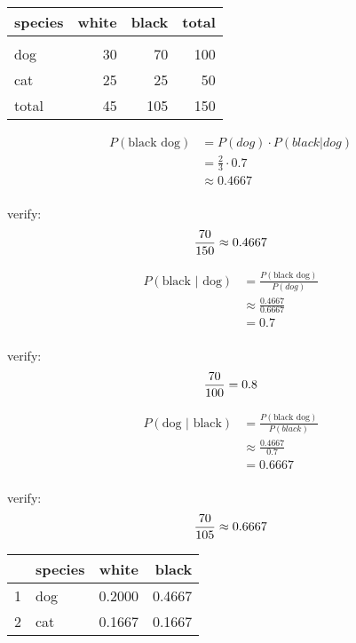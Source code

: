 \documentclass[landscape]{exam}
\begin{document}
  \begin{tabular}[H]{lrrr}
    \toprule
    species & white & black & total\\
    \midrule \\
    dog     & 30    & 70    & 100\\
    cat     & 25    & 25    & 50\\
    \midrule
    total   & 45    & 105   & 150\\
    \bottomrule
  \end{tabular}

  \begin{align*}
    P(\text{black dog}) & = P(dog) \cdot P(black | dog) \\
                        & = \frac{2}{3} \cdot 0.7 \\
                        & \approx 0.4667 \\
  \end{align*}
  
  verify:
  \[
    \frac{70}{150} \approx 0.4667 \\
  \]

  \begin{align*}
    P(\text{black | dog}) & = \frac{P(\text{black dog})}{P(dog)} \\
                          & \approx \frac{0.4667}{0.6667} \\
                          & = 0.7 \\
  \end{align*}

  verify:
  \[
    \frac{70}{100} = 0.8 \\
  \]

  \begin{align*}
    P(\text{dog | black}) & = \frac{P(\text{black dog})}{P(black)} \\
                          & \approx \frac{0.4667}{0.7} \\
                          & = 0.6667 \\
  \end{align*}

  verify:
  \[
    \frac{70}{105} \approx 0.6667 \\
  \]

  \begin{table}[H]
    \centering
    \begin{tabular}{rlrr}
      \toprule
          & species & white  & black \\
      \midrule
      1   & dog     & 0.2000 & 0.4667 \\
      2   & cat     & 0.1667 & 0.1667 \\
      \bottomrule
    \end{tabular}
  \end{table}
\end{document}
